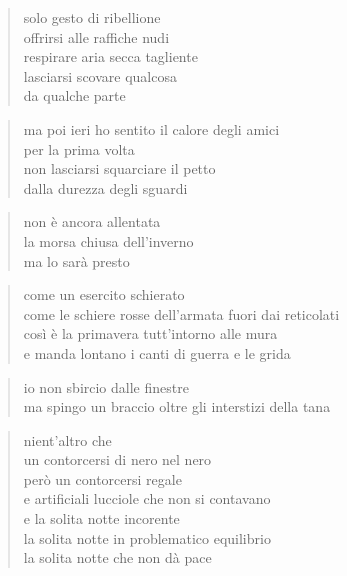 \clearpage


\begin{verse}
    solo gesto di ribellione\\
    offrirsi alle raffiche nudi\\
    respirare aria secca tagliente\\
    lasciarsi scovare qualcosa\\
    da qualche parte
\end{verse}

\begin{verse}
    ma poi ieri ho sentito il calore degli amici\\
    per la prima volta\\
    non lasciarsi squarciare il petto\\
    dalla durezza degli sguardi
\end{verse}

\clearpage


\begin{verse}
    non è ancora allentata\\
    la morsa chiusa dell'inverno\\
    ma lo sarà presto
\end{verse}

\begin{verse}
    come un esercito schierato\\
    come le schiere rosse dell'armata fuori dai reticolati\\
    così è la primavera tutt'intorno alle mura\\
    e manda lontano i canti di guerra e le grida
\end{verse}

\begin{verse}
    io non sbircio dalle finestre\\
    ma spingo un braccio oltre gli interstizi della tana
\end{verse}

\clearpage


\begin{verse}
    nient’altro che\\
    un contorcersi di nero nel nero\\
    però un contorcersi regale\\
    e artificiali lucciole che non si contavano\\
    e la solita notte incorente\\
    la solita notte in problematico equilibrio\\
    la solita notte che non dà pace
\end{verse}

